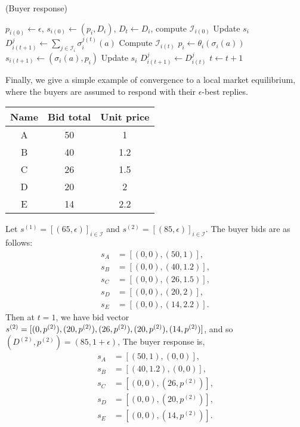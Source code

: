 \documentclass[sigconf, anonymous]{acmart}
\newcommand{\mcI}{\mathcal{I}}
\newcommand{\g}{\sigma}
\theoremstyle{definition}
\begin{document}
\begin{center}
\begin{algorithm}[H]
\caption{(Buyer response)}
\begin{algorithmic}[1]
\State $p_{i(0)} \gets \epsilon$, $s_{i(0)} \gets (p_i, D_i)$, $D_t \gets D_i$, compute
$\mcI_{i(0)}$
\State Update $s_i$ 
\State $D_{i(t+1)}^j \gets \sum_{j\in\mcI_i}\g_i^{j(t)}(a)$
    \State Compute $\mcI_{i(t)}$
    \State $p_i \gets \theta_i(\g_i(a))$
\EndIf
\State $s_{i(t+1)} \gets (\g_i(a), p_i)$
\State Update $s_i$
\State $D_{i(t+1)}^j \gets D_{i(t)}^j$
\State $t \gets t+1$
\EndWhile
\end{algorithmic}
\end{algorithm}
\end{center}
Finally, we give a simple example of convergence to a local market equilibrium, where the buyers are assumed to respond with their
$\epsilon$-best replies.
\begin{center}
\begin{tabular}{c|c|c}
Name & Bid total & Unit price\\
\hline
A & 50 & 1\\ 
B & 40 & 1.2\\
C & 26 & 1.5\\
D & 20 & 2\\
E & 14 & 2.2
\end{tabular}
\end{center}
Let $s^{(1)} = [(65,\epsilon)]_{i\in\mcI}$ and
$s^{(2)}=[(85,\epsilon)]_{i\in\mcI}$. The buyer bids are as follows: 
\begin{align*}
    s_A &= [(0,0), (50,1)], \\
    s_B &= [(0,0), (40,1.2)], \\
    s_C &= [(0,0),(26,1.5)], \\
    s_D &= [(0,0),(20,2)], \\
    s_E &= [(0,0), (14,2.2)]. 
\end{align*}
Then at $t=1$, we have 
bid vector $s^{(2)}=[(0,p^{(2)}), (20,p^{(2)}), (26,p^{(2)}),\\ (20,p^{(2)}),
(14,p^{(2)})]$, and so  $(D^{(2)},p^{(2)}) = (85, 1+\epsilon)$, The buyer response is,
\begin{align*}
    s_A &= [(50,1), (0,0)], \\
    s_B &= [(40,1.2), (0,0)], \\
    s_C &= [(0,0),(26,p^{(2)})], \\
    s_D &= [(0,0),(20,p^{(2)})], \\
    s_E &= [(0,0),(14,p^{(2)})].
\end{align*}
\end{document}

